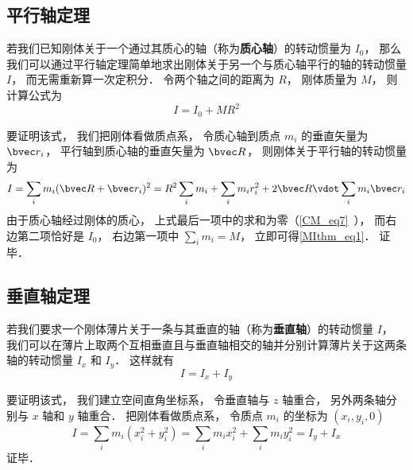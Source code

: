 

\subsection{平行轴定理}
若我们已知刚体关于一个通过其质心的轴（称为\textbf{质心轴}）的转动惯量为 $I_0$， 那么我们可以通过平行轴定理简单地求出刚体关于另一个与质心轴平行的轴的转动惯量 $I$， 而无需重新算一次定积分． 令两个轴之间的距离为 $R$， 刚体质量为 $M$， 则计算公式为%
\begin{equation}\label{MIthm_eq1}
I = I_0 + MR^2
\end{equation}

要证明该式， 我们把刚体看做质点系， 令质心轴到质点 $m_i$ 的垂直矢量为 $\bvec r_i$， 平行轴到质心轴的垂直矢量为 $\bvec R$， 则刚体关于平行轴的转动惯量为
\begin{equation}
I = \sum_i m_i (\bvec R + \bvec r_i)^2 = R^2\sum_i m_i + \sum_i m_i r_i^2 + 2\bvec R \vdot \sum_i m_i \bvec r_i
\end{equation}
由于质心轴经过刚体的质心， 上式最后一项中的求和为零（\autoref{CM_eq7}~）， 而右边第二项恰好是 $I_0$， 右边第一项中 $\sum_i m_i = M$， 立即可得\autoref{MIthm_eq1}． 证毕．


\subsection{垂直轴定理}

若我们要求一个刚体薄片关于一条与其垂直的轴（称为\textbf{垂直轴}）的转动惯量 $I$， 我们可以在薄片上取两个互相垂直且与垂直轴相交的轴并分别计算薄片关于这两条轴的转动惯量 $I_x$ 和 $I_y$． 这样就有
\begin{equation}\label{MIthm_eq2}
I = I_x + I_y
\end{equation}

要证明该式， 我们建立空间直角坐标系， 令垂直轴与 $z$ 轴重合， 另外两条轴分别与 $x$ 轴和 $y$ 轴重合． 把刚体看做质点系， 令质点 $m_i$ 的坐标为 $(x_i, y_i, 0)$
\begin{equation}
I = \sum_i m_i (x_i^2 + y_i^2) = \sum_i m_i x_i^2 + \sum_i m_i y_i^2 = I_y + I_x
\end{equation}
证毕．